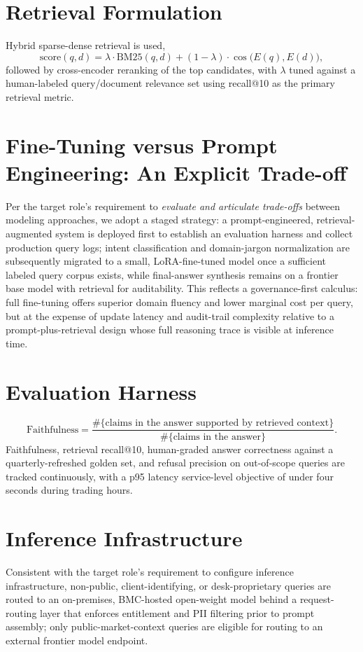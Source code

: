 \documentclass[11pt]{report}
\begin{document}
\section{Retrieval Formulation}
Hybrid sparse-dense retrieval is used,
\begin{equation}
\text{score}(q,d) = \lambda \cdot \text{BM25}(q,d) + (1-\lambda)\cdot \cos\big(E(q), E(d)\big),
\end{equation}
followed by cross-encoder reranking of the top candidates, with $\lambda$ tuned against a
human-labeled query/document relevance set using recall@10 as the primary retrieval metric.

\section{Fine-Tuning versus Prompt Engineering: An Explicit Trade-off}
Per the target role's requirement to \emph{evaluate and articulate trade-offs} between modeling
approaches, we adopt a staged strategy: a prompt-engineered, retrieval-augmented system is deployed
first to establish an evaluation harness and collect production query logs; intent classification and
domain-jargon normalization are subsequently migrated to a small, LoRA-fine-tuned model once a
sufficient labeled query corpus exists, while final-answer synthesis remains on a frontier base model
with retrieval for auditability. This reflects a governance-first calculus: full fine-tuning offers
superior domain fluency and lower marginal cost per query, but at the expense of update latency and
audit-trail complexity relative to a prompt-plus-retrieval design whose full reasoning trace is
visible at inference time.

\section{Evaluation Harness}
\begin{equation}
\text{Faithfulness} = \frac{\#\{\text{claims in the answer supported by retrieved context}\}}{\#\{\text{claims in the answer}\}}.
\end{equation}
Faithfulness, retrieval recall@10, human-graded answer correctness against a quarterly-refreshed
golden set, and refusal precision on out-of-scope queries are tracked continuously, with a p95
latency service-level objective of under four seconds during trading hours.

\section{Inference Infrastructure}
Consistent with the target role's requirement to configure inference infrastructure, non-public,
client-identifying, or desk-proprietary queries are routed to an on-premises, BMC-hosted open-weight
model behind a request-routing layer that enforces entitlement and PII filtering prior to prompt
assembly; only public-market-context queries are eligible for routing to an external frontier model
endpoint.
\end{document}
